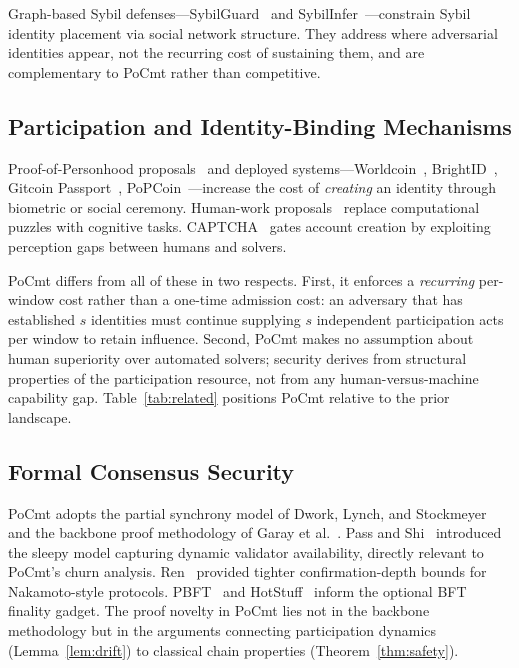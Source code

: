 \documentclass[10pt,journal,twoside]{IEEEtran}
\theoremstyle{remark}
\begin{document}
	Graph-based Sybil defenses---SybilGuard~\cite{yu2006sybilguard}
	and SybilInfer~\cite{danezis2009sybilinfer}---constrain
	Sybil identity placement via social network structure.
	They address where adversarial identities appear, not the
	recurring cost of sustaining them, and are complementary
	to PoCmt rather than competitive.
	
	\subsection{Participation and Identity-Binding Mechanisms}
	\label{ssec:rw-participation}
	
	Proof-of-Personhood proposals~\cite{borges2017popp,
		ford2020pseudonym} and deployed
	systems---Worldcoin~\cite{worldcoin2023},
	BrightID~\cite{brightid2022}, Gitcoin
	Passport~\cite{gitcoin2023},
	PoPCoin~\cite{ford2019popcoin}---increase the cost of
	\emph{creating} an identity through biometric or social
	ceremony.
	Human-work proposals~\cite{blocki2016humanwork,kopp2016umine}
	replace computational puzzles with cognitive tasks.
	CAPTCHA~\cite{vonahn2003captcha} gates account creation
	by exploiting perception gaps between humans and solvers.
	
	PoCmt differs from all of these in two respects.
	First, it enforces a \emph{recurring} per-window cost
	rather than a one-time admission cost: an adversary that
	has established $s$ identities must continue supplying
	$s$ independent participation acts per window to retain
	influence.
	Second, PoCmt makes no assumption about human superiority
	over automated solvers; security derives from structural
	properties of the participation resource, not from any
	human-versus-machine capability gap.
	Table~\ref{tab:related} positions PoCmt relative to the
	prior landscape.
	
	\subsection{Formal Consensus Security}
	\label{ssec:rw-formal}
	
	PoCmt adopts the partial synchrony model of Dwork, Lynch,
	and Stockmeyer~\cite{dwork1988partialsync} and the
	backbone proof methodology of Garay et
	al.~\cite{garay2015bitcoin,garay2020analysis}.
	Pass and Shi~\cite{pass2017sleepy} introduced the sleepy
	model capturing dynamic validator availability, directly
	relevant to PoCmt's churn analysis.
	Ren~\cite{ren2019analysis} provided tighter
	confirmation-depth bounds for Nakamoto-style protocols.
	PBFT~\cite{castro1999pbft} and
	HotStuff~\cite{yin2019hotstuff,abraham2020hotstuff} inform
	the optional BFT finality gadget.
	The proof novelty in PoCmt lies not in the backbone
	methodology but in the arguments connecting participation
	dynamics (Lemma~\ref{lem:drift}) to classical chain
	properties (Theorem~\ref{thm:safety}).
	
\end{document}
